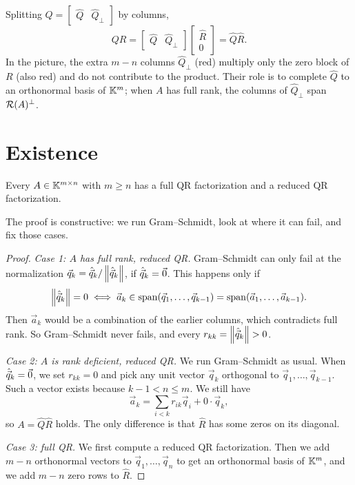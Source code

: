 Splitting $Q = \begin{bmatrix} \hat{Q} & \hat{Q}_\perp \end{bmatrix}$ by columns,
\begin{equation}
  QR = \begin{bmatrix} \hat{Q} & \hat{Q}_\perp \end{bmatrix}\begin{bmatrix} \hat{R} \\ 0 \end{bmatrix} = \hat{Q}\hat{R}.
\end{equation}
In the picture, the extra $m - n$ columns $\hat{Q}_\perp$ (red) multiply only the zero block of $R$ (also red) and do not contribute to the product. Their role is to complete $\hat{Q}$ to an orthonormal basis of $\mathbb{K}^m$; when $A$ has full rank, the columns of $\hat{Q}_\perp$ span $\mathcal{R}(A)^\perp$.

\section{Existence}

\begin{theorem}[Existence of QR]
  \label{thm:qr-exists}
  Every $A \in \mathbb{K}^{m \times n}$ with $m \ge n$ has a full QR factorization and a reduced QR factorization.
\end{theorem}

The proof is constructive: we run Gram--Schmidt, look at where it can fail, and fix those cases.

\begin{proof}
  \emph{Case 1: $A$ has full rank, reduced QR.} Gram--Schmidt can only fail at the normalization $\vec{q}_k = \hat{\vec{q}}_k/\left\lVert \hat{\vec{q}}_k \right\rVert$, if $\hat{\vec{q}}_k = \vec{0}$. This happens only if
  \begin{equation}
    \left\lVert \hat{\vec{q}}_k \right\rVert = 0 \iff \vec{a}_k \in \operatorname{span}(\vec{q}_1, \dots, \vec{q}_{k-1}) = \operatorname{span}(\vec{a}_1, \dots, \vec{a}_{k-1}).
  \end{equation}
  Then $\vec{a}_k$ would be a combination of the earlier columns, which contradicts full rank. So Gram--Schmidt never fails, and every $r_{kk} = \left\lVert \hat{\vec{q}}_k \right\rVert > 0$.

  \emph{Case 2: $A$ is rank deficient, reduced QR.} We run Gram--Schmidt as usual. When $\hat{\vec{q}}_k = \vec{0}$, we set $r_{kk} = 0$ and pick any unit vector $\vec{q}_k$ orthogonal to $\vec{q}_1, \dots, \vec{q}_{k-1}$. Such a vector exists because $k - 1 < n \le m$. We still have
  \begin{equation}
    \vec{a}_k = \sum_{i<k}r_{ik}\vec{q}_i + 0 \cdot \vec{q}_k,
  \end{equation}
  so $A = \hat{Q}\hat{R}$ holds. The only difference is that $\hat{R}$ has some zeros on its diagonal.

  \emph{Case 3: full QR.} We first compute a reduced QR factorization. Then we add $m - n$ orthonormal vectors to $\vec{q}_1, \dots, \vec{q}_n$ to get an orthonormal basis of $\mathbb{K}^m$, and we add $m - n$ zero rows to $\hat{R}$.
\end{proof}

